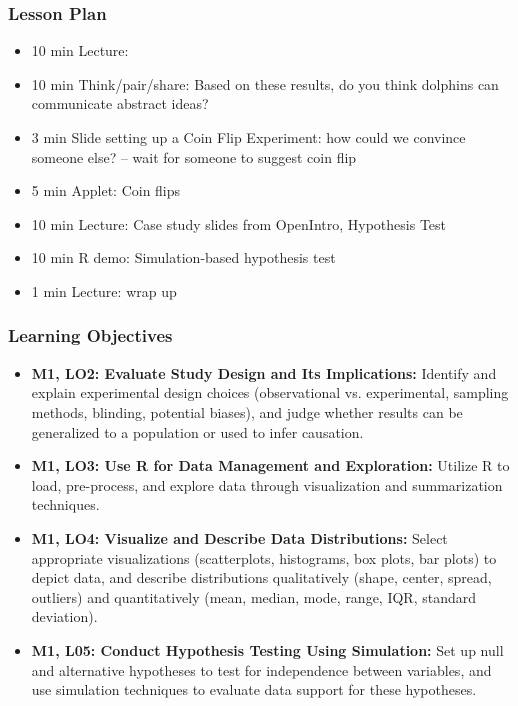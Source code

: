 \begin{frame}
    \frametitle{Lesson Plan}
    \begin{itemize}
        \item 10 min Lecture: 
        \item 10 min Think/pair/share: Based on these results, do you think dolphins can communicate abstract ideas?
        \item 3 min Slide setting up a Coin Flip Experiment: how could we convince someone else? -- wait for someone to suggest coin flip
        \item 5 min Applet: Coin flips
        \item 10 min Lecture: Case study slides from OpenIntro, Hypothesis Test
        \item 10 min R demo: Simulation-based hypothesis test
        \item 1 min Lecture: wrap up
    \end{itemize}
\end{frame}

\begin{frame}
    \frametitle{Learning Objectives}
    \begin{itemize}
        \item \textbf{M1, LO2: Evaluate Study Design and Its Implications:} Identify and explain experimental design choices (observational vs. experimental, sampling methods, blinding, potential biases), and judge whether results can be generalized to a population or used to infer causation. 
        \item \textbf{M1, LO3: Use R for Data Management and Exploration:} Utilize R to load, pre-process, and explore data through visualization and summarization techniques.
        \item \textbf{M1, LO4: Visualize and Describe Data Distributions:} Select appropriate visualizations (scatterplots, histograms, box plots, bar plots) to depict data, and describe distributions qualitatively (shape, center, spread, outliers) and quantitatively (mean, median, mode, range, IQR, standard deviation).
        \item \textbf{M1, L05: Conduct Hypothesis Testing Using Simulation:} Set up null and alternative hypotheses to test for independence between variables, and use simulation techniques to evaluate data support for these hypotheses.
    \end{itemize}
\end{frame}



